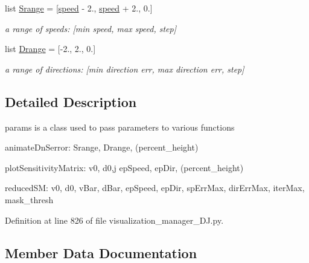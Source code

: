 \begin{DoxyCompactItemize}
list \mbox{\hyperlink{classvisualization__manager___d_j_1_1_visualization_manager_1_1params_a35c7f4aed6589385a5a87fca11b55a90}{Srange}} = \mbox{[}\mbox{\hyperlink{classvisualization__manager___d_j_1_1_visualization_manager_1_1params_af67bd6887a2486bd05116fca8ecbfe08}{speed}} -\/ 2., \mbox{\hyperlink{classvisualization__manager___d_j_1_1_visualization_manager_1_1params_af67bd6887a2486bd05116fca8ecbfe08}{speed}} + 2., 0.\mbox{]}
\begin{DoxyCompactList}\small\item\em a range of speeds\+: \mbox{[}min speed, max speed, step\mbox{]} \end{DoxyCompactList}\item 
list \mbox{\hyperlink{classvisualization__manager___d_j_1_1_visualization_manager_1_1params_af481a6429601c114aa05567f4c169ac1}{Drange}} = \mbox{[}-\/2., 2., 0.\mbox{]}
\begin{DoxyCompactList}\small\item\em a range of directions\+: \mbox{[}min direction err, max direction err, step\mbox{]} \end{DoxyCompactList}\end{DoxyCompactItemize}


\subsection{Detailed Description}
params is a class used to pass parameters to various functions 

animate\+Dn\+Serror\+: Srange, Drange, (percent\+\_\+height)

plot\+Sensitivity\+Matrix\+: v0, d0,j ep\+Speed, ep\+Dir, (percent\+\_\+height)

reduced\+SM\+: v0, d0, v\+Bar, d\+Bar, ep\+Speed, ep\+Dir, sp\+Err\+Max, dir\+Err\+Max, iter\+Max, mask\+\_\+thresh 

Definition at line 826 of file visualization\+\_\+manager\+\_\+\+D\+J.\+py.



\subsection{Member Data Documentation}
\mbox{\label{classvisualization__manager___d_j_1_1_visualization_manager_1_1params_ae89c909d412f7f049eeee5203416f69e}} 
